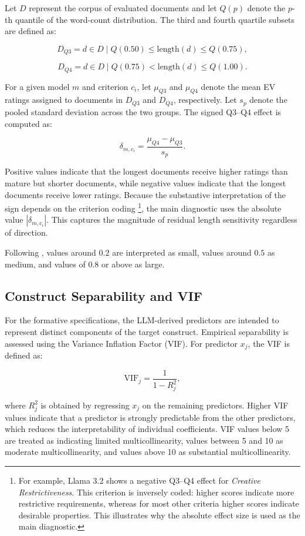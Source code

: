 Let $D$ represent the corpus of evaluated documents and let $Q(p)$ denote the $p$-th quantile of the word-count distribution. The third and fourth quartile subsets are defined as:

\[
D_{Q3} = {d \in D \mid Q(0.50) \leq \mathrm{length}(d) \leq Q(0.75)},
\]

\[
D_{Q4} = {d \in D \mid Q(0.75) < \mathrm{length}(d) \leq Q(1.00)}.
\]

For a given model $m$ and criterion $c_i$, let $\mu_{Q3}$ and $\mu_{Q4}$ denote the mean EV ratings assigned to documents in $D_{Q3}$ and $D_{Q4}$, respectively. Let $s_p$ denote the pooled standard deviation across the two groups. The signed Q3--Q4 effect is computed as:

\[
\delta_{m,c_i} = \frac{\mu_{Q4} - \mu_{Q3}}{s_p}.
\]



Positive values indicate that the longest documents receive higher ratings than mature but shorter documents, while negative values indicate that the longest documents receive lower ratings. Because the substantive interpretation of the sign depends on the criterion coding \footnote{For example, Llama 3.2 shows a negative Q3--Q4 effect for \textit{Creative Restrictiveness}. This criterion is inversely coded: higher scores indicate more restrictive requirements, whereas for most other criteria higher scores indicate desirable properties. This illustrates why the absolute effect size is used as the main diagnostic.}, the main diagnostic uses the absolute value $|\delta_{m,c_i}|$. This captures the magnitude of residual length sensitivity regardless of direction.

Following \citet{cohen1988statistical}, values around $0.2$ are interpreted as small, values around $0.5$ as medium, and values of $0.8$ or above as large.


\subsection{Construct Separability and VIF}
\label{app:vif_diagnostics_prose}

For the formative specifications, the LLM-derived predictors are intended to represent distinct components of the target construct. Empirical separability is assessed using the Variance Inflation Factor (VIF). For predictor $x_j$, the VIF is defined as:

\[
\mathrm{VIF}_j = \frac{1}{1 - R_j^2},
\]

where $R_j^2$ is obtained by regressing $x_j$ on the remaining predictors. Higher VIF values indicate that a predictor is strongly predictable from the other predictors, which reduces the interpretability of individual coefficients. VIF values below 5 are treated as indicating limited multicollinearity, values between 5 and 10 as moderate multicollinearity, and values above 10 as substantial multicollinearity.
